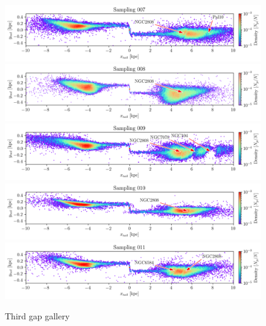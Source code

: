 \documentclass{aa}
\begin{document}
\begin{appendix}
    \begin{figure}
      \centering
      \includegraphics[width=\linewidth]{gallery_of_gaps_monte-carlo-007.png}
      \includegraphics[width=\linewidth]{gallery_of_gaps_monte-carlo-008.png}
      \includegraphics[width=\linewidth]{gallery_of_gaps_monte-carlo-009.png}      
      \includegraphics[width=\linewidth]{gallery_of_gaps_monte-carlo-010.png}
      \includegraphics[width=\linewidth]{gallery_of_gaps_monte-carlo-011.png}
      \caption{Third gap gallery}
      \label{fig:gallery2}
      \end{figure}        



\end{appendix}
\end{document}
